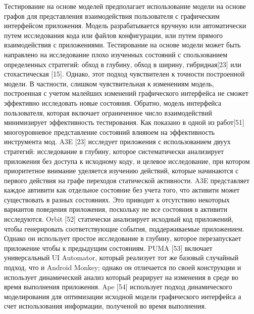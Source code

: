 Тестирование на основе моделей предполагает использование модели на основе графов для представления взаимодействия пользователя с графическим интерфейсом приложения. Модель разрабатывается вручную или автоматически путем исследования кода или файлов конфигурации, или путем прямого взаимодействия с приложениями. Тестирование на основе модели может быть направлено на исследование плохо изученных состояний с спользованием определенных стратегий: обход в глубину, обход в ширину, гибридная[23] или стохастическая [15]. Однако, этот подход чувствителен к точности построенной модели. В частности, слишком чувствительная к изменениям модель, построенная с учетом малейших изменений графического интерфейса не сможет эффективно исследовать новые состояния. Обратно, модель интерфейса пользователя, которая включает ограниченное число взаимодействий минимизирует эффективность тестирования. Как показано в одной из работ[51] многоуровневое представление состояний влияюем на эффективность инструмента мод. A3E [23] исследует приложения с использованием двуух стратегий: исследование в глубину, которое систематически анализирует приложения без доступа к исходному коду, и целевое исследование, при котором приоритетное внимание уделяется изучению действий, которые начинаются с первого действия на графе переходов статической активности. A3E представляет каждое автивити как отдельное состояние без учета того, что активити может существовать в разных состояниях. Это приводит к отсутствию некоторых вариантов поведения приложения, поскольку не все состояния в активити исследуются. Orbit [52] статически анализирует исходный код приложений, чтобы генерировать соответствующие события, поддерживаемые приложением. Однако он использует простое исследование в глубину, которое перезапускает приложение чтобы к предыдущим состояниям. PUMA [53] включает универсальный UI Automator, который реализует тот же базовый случайный подход, что и Android Monkey; однако он отличается по своей конструкции и использует динамический анализ который реарирует на изменения в среде во время выполнения приложения. Ape [54] использует подход динамического моделирования для оптимизации исходной модели графического интерфейса а счет использования информации, полученой во время выполнения.

